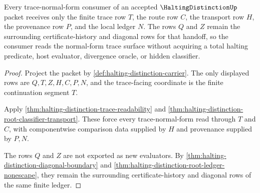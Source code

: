 \begin{theorem}
\label{thm:halting-distinction-trace-normal-form-handoff}
Every trace-normal-form consumer of an accepted $\HaltingDistinctionUp$ packet receives only the finite trace row $T$, the route row $C$, the transport row $H$, the provenance row $P$, and the local ledger $N$. The rows $Q$ and $Z$ remain the surrounding certificate-history and diagonal rows for that handoff, so the consumer reads the normal-form trace surface without acquiring a total halting predicate, host evaluator, divergence oracle, or hidden classifier.
\end{theorem}
\begin{proof}
Project the packet by \autoref{def:halting-distinction-carrier}. The only displayed rows are $Q,T,Z,H,C,P,N$, and the trace-facing coordinate is the finite continuation segment $T$.

Apply \autoref{thm:halting-distinction-trace-readability} and \autoref{thm:halting-distinction-root-classifier-transport}. These force every trace-normal-form read through $T$ and $C$, with componentwise comparison data supplied by $H$ and provenance supplied by $P,N$.

The rows $Q$ and $Z$ are not exported as new evaluators. By \autoref{thm:halting-distinction-diagonal-boundary} and \autoref{thm:halting-distinction-root-ledger-nonescape}, they remain the surrounding certificate-history and diagonal rows of the same finite ledger.
\end{proof}

